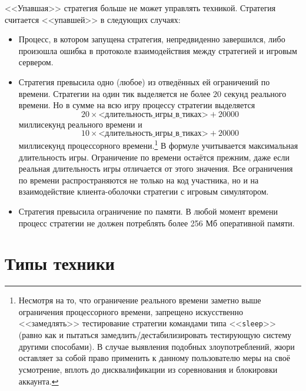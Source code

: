 <<Упавшая>> стратегия больше не может управлять техникой. Стратегия считается <<упавшей>> в следующих случаях:
\begin{itemize}
  \item Процесс, в котором запущена стратегия, непредвиденно завершился, либо произошла ошибка в протоколе взаимодействия между стратегией
        и игровым сервером.
  \item Стратегия превысила одно (любое) из отведённых ей ограничений по времени. Стратегии на один тик выделяется не более $20$ секунд
        реального времени. Но в сумме на всю игру процессу стратегии выделяется
        \begin{equation}
        20\times\textit{<длительность\_игры\_в\_тиках>}+20000
        \end{equation}
        миллисекунд реального времени и
        \begin{equation}
        10\times\textit{<длительность\_игры\_в\_тиках>}+20000
        \end{equation}
        миллисекунд процессорного времени.\footnote[1]{Несмотря на то, что ограничение реального времени заметно выше ограничения
        процессорного времени, запрещено искусственно <<замедлять>> тестирование стратегии командами типа <<\texttt{sleep}>> (равно как и
        пытаться замедлить/дестабилизировать тестирующую систему другими способами). В случае выявления подобных злоупотреблений, жюри
        оставляет за собой право применить к данному пользователю меры на своё усмотрение, вплоть до дисквалификации из соревнования и
        блокировки аккаунта.} В формуле учитывается максимальная длительность игры. Ограничение по времени остаётся прежним, даже если
        реальная длительность игры отличается от этого значения. Все ограничения по времени распространяются не только на код участника, но
        и на взаимодействие клиента-оболочки стратегии с игровым симулятором.
  \item Стратегия превысила ограничение по памяти. В любой момент времени процесс стратегии не должен потреблять более 256 Мб оперативной
        памяти.
\end{itemize}

\section{Типы техники}


